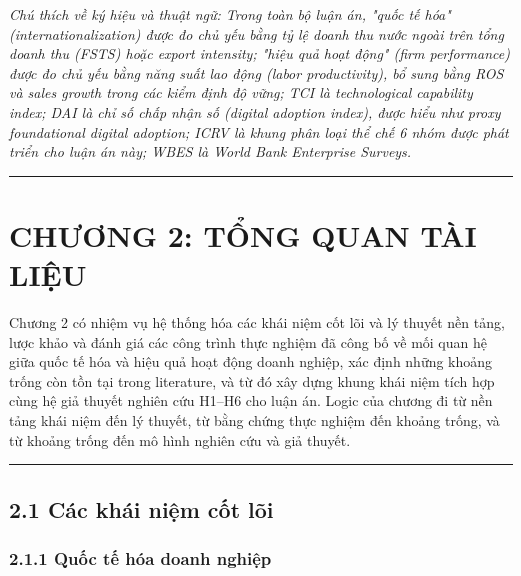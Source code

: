 \documentclass[12pt,a4paper]{article}
\begin{document}
\emph{Chú thích về ký hiệu và thuật ngữ: Trong toàn bộ luận án, "quốc tế
hóa" (internationalization) được đo chủ yếu bằng tỷ lệ doanh thu nước
ngoài trên tổng doanh thu (FSTS) hoặc export intensity; "hiệu quả hoạt
động" (firm performance) được đo chủ yếu bằng năng suất lao động (labor
productivity), bổ sung bằng ROS và sales growth trong các kiểm định độ
vững; TCI là technological capability index; DAI là chỉ số chấp nhận số
(digital adoption index), được hiểu như proxy foundational digital
adoption; ICRV là khung phân loại thể chế 6 nhóm được phát triển cho
luận án này; WBES là World Bank Enterprise Surveys.}

\begin{center}\rule{0.5\linewidth}{0.5pt}\end{center}

\hypertarget{chux1b0ux1a1ng-2-tux1ed5ng-quan-tuxe0i-liux1ec7u}{%
\section{CHƯƠNG 2: TỔNG QUAN TÀI
LIỆU}\label{chux1b0ux1a1ng-2-tux1ed5ng-quan-tuxe0i-liux1ec7u}}

Chương 2 có nhiệm vụ hệ thống hóa các khái niệm cốt lõi và lý thuyết nền
tảng, lược khảo và đánh giá các công trình thực nghiệm đã công bố về mối
quan hệ giữa quốc tế hóa và hiệu quả hoạt động doanh nghiệp, xác định
những khoảng trống còn tồn tại trong literature, và từ đó xây dựng khung
khái niệm tích hợp cùng hệ giả thuyết nghiên cứu H1--H6 cho luận án.
Logic của chương đi từ nền tảng khái niệm đến lý thuyết, từ bằng chứng
thực nghiệm đến khoảng trống, và từ khoảng trống đến mô hình nghiên cứu
và giả thuyết.

\begin{center}\rule{0.5\linewidth}{0.5pt}\end{center}

\hypertarget{21-cuxe1c-khuxe1i-niux1ec7m-cux1ed1t-luxf5i}{%
\subsection{2.1 Các khái niệm cốt
lõi}\label{21-cuxe1c-khuxe1i-niux1ec7m-cux1ed1t-luxf5i}}

\hypertarget{211-quux1ed1c-tux1ebf-huxf3a-doanh-nghiux1ec7p}{%
\subsubsection{2.1.1 Quốc tế hóa doanh
nghiệp}\label{211-quux1ed1c-tux1ebf-huxf3a-doanh-nghiux1ec7p}}
\end{document}
